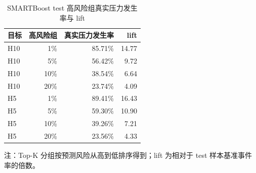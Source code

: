 \begin{table}[H]
\centering
\caption{SMARTBoost test 高风险组真实压力发生率与 lift}
\label{tab:smartboost-topk}
\small
\begin{threeparttable}
\begin{tabular}{lrrr}
\toprule
目标 & 高风险组 & 真实压力发生率 & lift \\
\midrule
H10 & 1\% & 85.71\% & 14.77 \\
H10 & 5\% & 56.42\% & 9.72 \\
H10 & 10\% & 38.54\% & 6.64 \\
H10 & 20\% & 23.74\% & 4.09 \\
H5 & 1\% & 89.41\% & 16.43 \\
H5 & 5\% & 59.30\% & 10.90 \\
H5 & 10\% & 39.26\% & 7.21 \\
H5 & 20\% & 23.56\% & 4.33 \\
\bottomrule
\end{tabular}
\begin{tablenotes}[flushleft]
\footnotesize
\item 注：Top-K 分组按预测风险从高到低排序得到；lift 为相对于 test 样本基准事件率的倍数。
\end{tablenotes}
\end{threeparttable}
\end{table}
